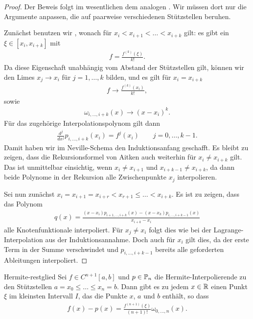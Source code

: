 \begin{proof}
  Der Beweis folgt im wesentlichen dem analogen
  . Wir müssen dort nur die Argumente
  anpassen, die auf paarweise verschiedenen Stützstellen beruhen.
  
  Zunächst benutzen wir ,
  wonach für $x_i < x_{i+1}< \dots < x_{i+k}$ gilt: es gibt ein
  $\xi\in[x_i,x_{i+k}]$ mit
  \begin{gather}
    [x_i,\dots,x_{i+k}]f = \frac{f^{(k)}(\xi)}{k!}.
  \end{gather}
  Da diese Eigenschaft unabhängig vom Abstand der Stützstellen gilt,
  können wir den Limes $x_j \to x_i$ für $j=1,\dots,k$ bilden, und es
  gilt für $x_i=x_{i+k}$
  \begin{gather}
    [x_i,\dots,x_{i+k}]f \to \frac{f^{(k)}(x_i)}{k!},
  \end{gather}
  sowie
  \begin{gather}
    \omega_{i,\dots,i+k}(x) \to (x-x_i)^{k}.
  \end{gather}
  Für das zugehörige Interpolationspolynom gilt dann
  \begin{gather}
    \frac{d^j}{dx^j} p_{i,\dots,i+k}(x_i) = f^{j}(x_i)
    \qquad j=0,\dots,k-1.
  \end{gather}
  Damit haben wir im Neville-Schema den Induktionsanfang geschafft. Es
  bleibt zu zeigen, dass die Rekursionsformel von Aitken auch
  weiterhin für $x_i \neq x_{i+k}$ gilt. Das ist unmittelbar
  einsichtig, wenn $x_i \neq x_{i+1}$ und $x_{i+k-1} \neq x_{i+k}$, da
  dann beide Polynome in der Rekursion alle Zwischenpunkte $x_j$
  interpolieren.

  Sei nun zunächst
  $x_i=x_{i+1}= x_{i+r} < x_{r+1} \le \dots < x_{i+k}$. Es ist zu
  zeigen, dass das Polynom
  \begin{gather}
    q(x) = \frac{(x-x_i) p_{i+1,\dots,i+k}(x)
      - (x-x_k) p_{i,\dots,i+k-1}(x)}{x_{i+k}-x_i}
  \end{gather}
  alle Knotenfunktionale interpoliert. Für $x_j\neq x_i$ folgt dies
  wie bei der Lagrange-Interpolation aus der Induktionsannahme. Doch
  auch für $x_i$ gilt dies, da der erste Term in der Summe
  verschwindet und $p_{i,\dots,i+k-1}$ bereits alle geforderten
  Ableitungen interpoliert.
\end{proof}

\begin{Satz}{Hermite-restglied}
    Sei $f \in C^{n+1}[a,b]$ und $p\in \P_n$ die
  Hermite-Interpolierende zu den Stützstellen
  $a=x_0\le\dots\le x_n=b$. Dann gibt es zu jedem $x\in \R$ einen Punkt
  $\xi$ im kleinsten Intervall $I$, das die Punkte $x$, $a$ und $b$
  enthält, so dass
  \begin{gather}
    f(x)- p(x) = \frac{f^{(n+1)}(\xi)}{(n+1)!} \omega_{0,\dots,n}(x).
  \end{gather}
\end{Satz}

